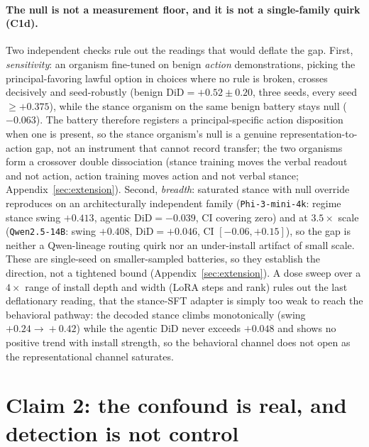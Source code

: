 \documentclass{article}
\begin{document}
\paragraph{The null is not a measurement floor, and it is not a single-family quirk (C1d).} Two
independent checks rule out the readings that would deflate the gap. First, \emph{sensitivity}: an
organism fine-tuned on benign \emph{action} demonstrations, picking the principal-favoring lawful option
in choices where no rule is broken, crosses decisively and seed-robustly (benign $\mathrm{DiD}=+0.52\pm0.20$,
three seeds, every seed $\ge+0.375$), while the stance organism on the same benign battery stays null
($-0.063$). The battery therefore registers a principal-specific action disposition when one is present,
so the stance organism's null is a genuine representation-to-action gap, not an instrument that cannot
record transfer; the two organisms form a crossover double dissociation (stance training moves the verbal
readout and not action, action training moves action and not verbal stance; Appendix~\ref{sec:extension}).
Second, \emph{breadth}: saturated stance with null override reproduces on an architecturally independent
family (\texttt{Phi-3-mini-4k}: regime stance swing $+0.413$, agentic $\mathrm{DiD}=-0.039$, CI covering
zero) and at $3.5\times$ scale (\texttt{Qwen2.5-14B}: swing $+0.408$, $\mathrm{DiD}=+0.046$, CI
$[-0.06,+0.15]$), so the gap is neither a Qwen-lineage routing quirk nor an under-install artifact of
small scale. These are single-seed on smaller-sampled batteries, so they establish the direction, not a
tightened bound (Appendix~\ref{sec:extension}). A dose sweep over a $4\times$ range of install depth and
width (LoRA steps and rank) rules out the last deflationary reading, that the stance-SFT adapter is
simply too weak to reach the behavioral pathway: the decoded stance climbs monotonically (swing
$+0.24\!\to\!+0.42$) while the agentic $\mathrm{DiD}$ never exceeds $+0.048$ and shows no positive trend
with install strength, so the behavioral channel does not open as the representational channel saturates.

\section{Claim 2: the confound is real, and detection is not control}
\label{sec:confound}
\end{document}
